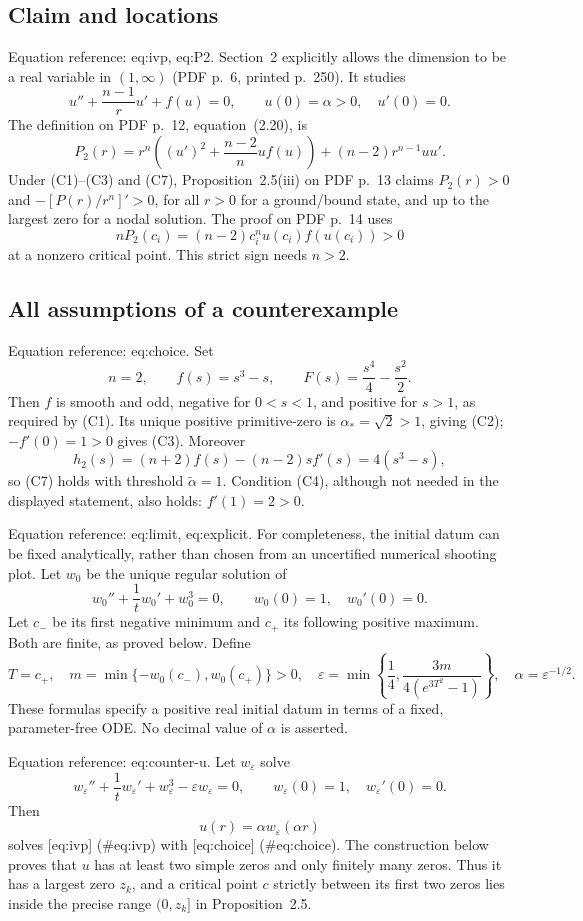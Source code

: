 \documentclass[10pt]{article}
\begin{document}
\subsection*{Claim and locations}
Equation reference: eq:ivp, eq:P2. Section 2 explicitly allows the dimension to be a real variable in \((1,\infty)\) (PDF p. 6, printed p. 250). It studies \[
 u''+\frac{n-1}{r}u'+f(u)=0,\qquad u(0)=\alpha>0,\quad u'(0)=0.\] The definition on PDF p. 12, equation (2.20), is \[
 P_2(r)=r^n\left((u')^2+\frac{n-2}{n}uf(u)\right)
             +(n-2)r^{n-1}uu'.\] Under (C1)–(C3) and (C7), Proposition 2.5(iii) on PDF p. 13 claims \(P_2(r)>0\) and \(-[P(r)/r^n]'>0\), for all \(r>0\) for a ground/bound state, and up to the largest zero for a nodal solution. The proof on PDF p. 14 uses \[nP_2(c_i)=(n-2)c_i^n u(c_i)f(u(c_i))>0\] at a nonzero critical point. This strict sign needs \(n>2\).\par
\subsection*{All assumptions of a counterexample}
Equation reference: eq:choice. Set \[
 n=2,\qquad f(s)=s^3-s,\qquad
 F(s)=\frac{s^4}{4}-\frac{s^2}{2}.\] Then \(f\) is smooth and odd, negative for \(0<s<1\), and positive for \(s>1\), as required by (C1). Its unique positive primitive-zero is \(\alpha_*=\sqrt2>1\), giving (C2); \(-f'(0)=1>0\) gives (C3). Moreover \[h_2(s)=(n+2)f(s)-(n-2)sf'(s)=4(s^3-s),\] so (C7) holds with threshold \(\widetilde\alpha=1\). Condition (C4), although not needed in the displayed statement, also holds: \(f'(1)=2>0\).\par
Equation reference: eq:limit, eq:explicit. For completeness, the initial datum can be fixed analytically, rather than chosen from an uncertified numerical shooting plot. Let \(w_0\) be the unique regular solution of \[
 w_0''+\frac1t w_0'+w_0^3=0,\qquad w_0(0)=1,\quad w_0'(0)=0.\] Let \(c_-\) be its first negative minimum and \(c_+\) its following positive maximum. Both are finite, as proved below. Define \[
 T=c_+,\quad m=\min\{-w_0(c_-),w_0(c_+)\}>0,\quad
 \varepsilon=\min\left\{\frac14,\frac{3m}{4(e^{3T^2}-1)}\right\},
 \quad \alpha=\varepsilon^{-1/2}.\] These formulas specify a positive real initial datum in terms of a fixed, parameter-free ODE. No decimal value of \(\alpha\) is asserted.\par
Equation reference: eq:counter-u. Let \(w_\varepsilon\) solve \[w_\varepsilon''+\frac1t w_\varepsilon'
       +w_\varepsilon^3-\varepsilon w_\varepsilon=0,\qquad
 w_\varepsilon(0)=1,\quad w_\varepsilon'(0)=0.\] Then \[
 u(r)=\alpha w_\varepsilon(\alpha r)\] solves [eq:ivp] (\#eq:ivp) with [eq:choice] (\#eq:choice). The construction below proves that \(u\) has at least two simple zeros and only finitely many zeros. Thus it has a largest zero \(z_k\), and a critical point \(c\) strictly between its first two zeros lies inside the precise range \((0,z_k]\) in Proposition 2.5.\par
\end{document}
